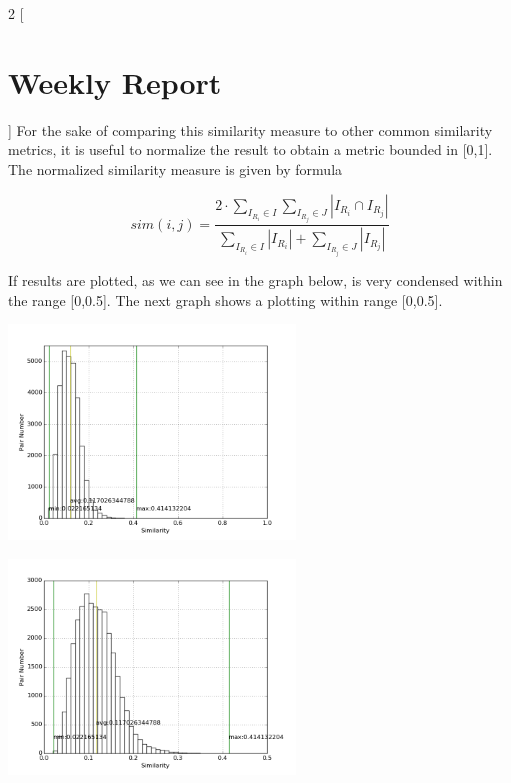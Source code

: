 \documentclass[12pt]{report}
\begin{document}

\begin{multicols}{2}
[\section*{Weekly Report}
]
For the sake of comparing this similarity measure to other common similarity metrics, it is useful to normalize the result to obtain a metric bounded in [0,1]. The normalized similarity measure is given by formula

\begin{equation}
sim(i,j) = \frac{2 \cdot \sum_{I_{R_i} \in I} \sum_{ I_{R_j} \in J} |I_{R_i} \cap I_{R_j}|}{\sum_{I_{R_i} \in I} |I_{R_i}| + \sum_{I_{R_j} \in J} |I_{R_j}|}
\end{equation}

If results are plotted, as we can see in the graph below, is very condensed within the range [0,0.5]. The next graph shows a plotting within range [0,0.5].


\begin{center}
\includegraphics[width=3in]{normalized_similarity_distribution.png}
\end{center}

\begin{center}
\includegraphics[width=3in]{extended_normalized_similarity_distribution.png}
\end{center}


\end{multicols}
\end{document}
